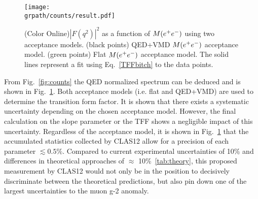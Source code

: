 	\begin{figure}[h!]\begin{center}
			\texttt{[image: \\grpath/counts/result.pdf]}
			\caption[TFF as a function of $M(\epem)$]{\label{fig:results}{(Color Online)$\left|F(q^2)\right|^2$ as a function of $M(\epem)$ using two acceptance models. (black points) QED+VMD $M(\epem)$ acceptance model. (green points) Flat $M(\epem)$ acceptance model. The solid lines represent a fit using Eq.~\ref{TFFbitch} to the data points.}}
		\end{center}\end{figure}

	\FloatBarrier
	From Fig.~\ref{fig:counts} the QED normalized spectrum can be deduced and is shown in Fig.~\ref{fig:results}. Both acceptance models (i.e. flat and QED+VMD) are used to determine the transition form factor. It is shown that there exists a systematic uncertainty depending on the chosen acceptance model. However, the final calculation on the slope parameter or the TFF shows a negligible impact of this uncertainty. Regardless of the acceptance model, it is shown in Fig.~\ref{fig:results} that the accumulated statistics collected by CLAS12 allow for a precision of each parameter $\lesssim 0.5\%$. Compared to current experimental uncertainties of 10\% and differences in theoretical approaches of $\approx$ 10\%~\ref{tab:theory}, this proposed measurement by CLAS12 would not only be in the position to decisively discriminate between the theoretical predictions, but also pin down one of the largest uncertainties to the muon g-2 anomaly.
